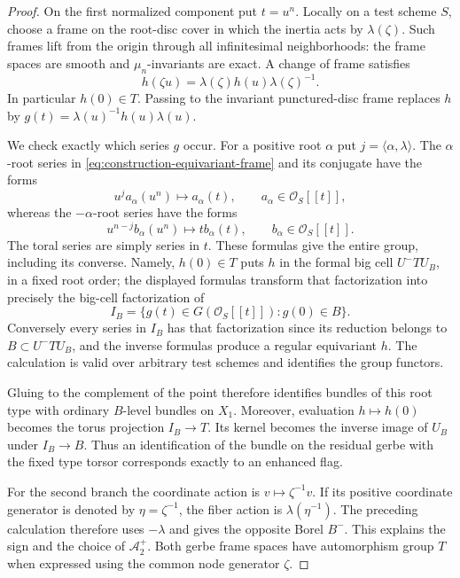 \begin{proof}
On the first normalized component put $t=u^n$.  Locally on a test
scheme $S$, choose a frame on the root-disc cover in which the inertia
acts by $\lambda(\zeta)$.  Such frames lift from the origin through
all infinitesimal neighborhoods: the frame spaces are smooth and
$\mu_n$-invariants are exact.  A change of frame satisfies
\begin{equation}\label{eq:construction-equivariant-frame}
 h(\zeta u)=\lambda(\zeta)h(u)\lambda(\zeta)^{-1}.
\end{equation}
In particular $h(0)\in T$.  Passing to the invariant punctured-disc
frame replaces $h$ by
$g(t)=\lambda(u)^{-1}h(u)\lambda(u)$.

We check exactly which series $g$ occur.  For a positive root $\alpha$
put $j=\langle\alpha,\lambda\rangle$.  The $\alpha$-root series in
\eqref{eq:construction-equivariant-frame} and its conjugate have the
forms
\[
 u^j a_\alpha(u^n)\longmapsto a_\alpha(t),
 \qquad a_\alpha\in\mathcal O_S[[t]],
\]
whereas the $-\alpha$-root series have the forms
\[
 u^{n-j}b_\alpha(u^n)\longmapsto t b_\alpha(t),
 \qquad b_\alpha\in\mathcal O_S[[t]].
\]
The toral series are simply series in $t$.  These formulas give the
entire group, including its converse.  Namely, $h(0)\in T$ puts $h$
in the formal big cell $U^-TU_B$, in a fixed root order; the displayed
formulas transform that factorization into precisely the big-cell
factorization of
\[
 I_B=\{g(t)\in G(\mathcal O_S[[t]]):g(0)\in B\}.
\]
Conversely every series in $I_B$ has that factorization since its
reduction belongs to $B\subset U^-TU_B$, and the inverse formulas
produce a regular equivariant $h$.  The calculation is valid over
arbitrary test schemes and identifies the group functors.

Gluing to the complement of the point therefore identifies bundles of
this root type with ordinary $B$-level bundles on $X_1$.  Moreover,
evaluation $h\mapsto h(0)$ becomes the torus projection $I_B\to T$.
Its kernel becomes the inverse image of $U_B$ under $I_B\to B$.
Thus an identification of the bundle on the residual gerbe with the
fixed type torsor corresponds exactly to an enhanced flag.

For the second branch the coordinate action is
$v\mapsto\zeta^{-1}v$.  If its positive coordinate generator is denoted
by $\eta=\zeta^{-1}$, the fiber action is $\lambda(\eta^{-1})$.
The preceding calculation therefore uses $-\lambda$ and gives the
opposite Borel $B^-$.  This explains the sign and the choice of
$\mathcal A_2^+$.  Both gerbe frame spaces have automorphism group $T$
when expressed using the common node generator $\zeta$.


\end{proof}

